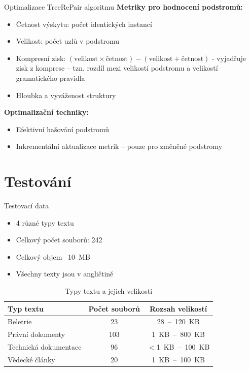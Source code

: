 \documentclass[lualatex,hyperref={pdfencoding=auto}]{beamer}
\begin{document}
\begin{frame}{Optimalizace TreeRePair algoritmu}
      \textbf{Metriky pro hodnocení podstromů:}
      \begin{itemize}
        \item Četnost výskytu: počet identických instancí
        \item Velikost: počet uzlů v podstromu
        \item Kompresní zisk: $(\text{velikost} \times \text{četnost}) - (\text{velikost} + \text{četnost})$ - vyjadřuje zisk z komprese -- tzn. rozdíl mezi velikostí podstromu a velikostí gramatického pravidla
        \item Hloubka a vyváženost struktury
      \end{itemize}
      
      \textbf{Optimalizační techniky:}
      \begin{itemize}
        \item Efektivní hašování podstromů
        \item Inkrementální aktualizace metrik -- pouze pro změněné podstromy
      \end{itemize}
\end{frame}



\section{Testování}

\begin{frame}{Testovací data}
      \begin{itemize}
        \item 4 různé typy textu
        \item Celkový počet souborů: 242
        \item Celkový objem ~10~MB
        \item Všechny texty jsou v angličtině
      \end{itemize}
      \vspace{12pt}
    \begin{table}[ht]
      \centering
      \begin{tabular}{|l|c|c|}
        \hline
        \textbf{Typ textu} & \textbf{Počet souborů} & \textbf{Rozsah velikostí} \\
        \hline
        Beletrie & 23 & 28~--~120~KB \\
        Právní dokumenty & 103 & 1~KB~--~800~KB \\
        Technická dokumentace & 96 & $<$1~KB~--~100~KB \\
        Vědecké články & 20 & 1~KB~--~100~KB \\
        \hline
      \end{tabular}
      \caption{Typy textu a jejich velikosti}
    \end{table}
\end{frame}
\end{document}
